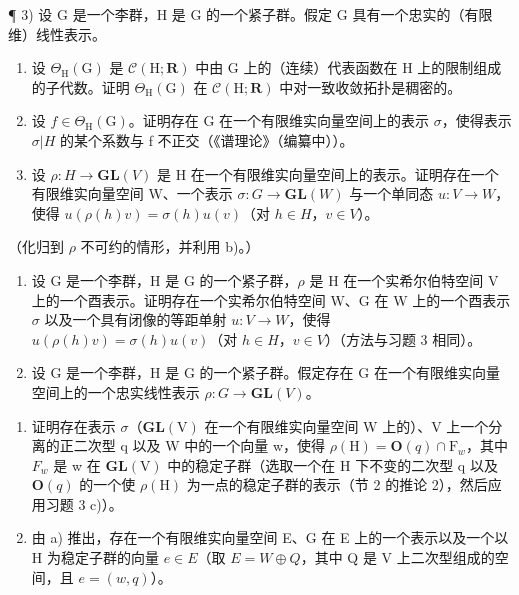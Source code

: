 \begin{enumerate}
¶ 3) 设 G 是一个李群，H 是 G 的一个紧子群。假定 G 具有一个忠实的（有限维）线性表示。

\begin{enumerate}
\def\labelenumi{\alph{enumi})}
\item
  设 \(\Theta_{\mathrm{H}}(\mathrm{G})\) 是 \(\mathcal{C}(\mathrm{H};\mathbf{R})\) 中由 G 上的（连续）代表函数在 H 上的限制组成的子代数。证明 \(\Theta_{\mathrm{H}}(\mathrm{G})\) 在 \(\mathcal{C}(\mathrm{H};\mathbf{R})\) 中对一致收敛拓扑是稠密的。
\item
  设 \(f \in \Theta_{\mathrm{H}}(\mathrm{G})\)。证明存在 G 在一个有限维实向量空间上的表示 \(\sigma\)，使得表示 \(\sigma|H\) 的某个系数与 f 不正交（《谱理论》（编纂中））。
\item
  设 \(\rho:H\to\mathbf{GL}(V)\) 是 H 在一个有限维实向量空间上的表示。证明存在一个有限维实向量空间 W、一个表示 \(\sigma:G\to\mathbf{GL}(W)\) 与一个单同态 \(u:V\to W\)，使得 \(u(\rho(h)v)=\sigma(h)u(v)\)（对 \(h\in H\)，\(v\in V\)）。
\end{enumerate}

（化归到 \(\rho\) 不可约的情形，并利用 b)。）

\begin{enumerate}
\def\labelenumi{\arabic{enumi})}
\setcounter{enumi}{3}
\item
  设 G 是一个李群，H 是 G 的一个紧子群，\(\rho\) 是 H 在一个实希尔伯特空间 V 上的一个酉表示。证明存在一个实希尔伯特空间 W、G 在 W 上的一个酉表示 \(\sigma\) 以及一个具有闭像的等距单射 \(u: V \to W\)，使得 \(u(\rho(h)v) = \sigma(h)u(v)\)（对 \(h \in H\)，\(v \in V\)）（方法与习题 3 相同）。
\item
  设 G 是一个李群，H 是 G 的一个紧子群。假定存在 G 在一个有限维实向量空间上的一个忠实线性表示 \(\rho: G \to \mathbf{GL}(V)\)。
\end{enumerate}

\begin{enumerate}
\def\labelenumi{\alph{enumi})}
\item
  证明存在表示 \(\sigma\)（\(\mathbf{GL}(\mathrm{V})\) 在一个有限维实向量空间 W 上的）、V 上一个分离的正二次型 q 以及 W 中的一个向量 w，使得 \(\rho(\mathrm{H}) = \mathbf{O}(q) \cap \mathrm{F}_{w}\)，其中 \(F_{w}\) 是 w 在 \(\mathbf{GL}(\mathrm{V})\) 中的稳定子群（选取一个在 H 下不变的二次型 q 以及 \(\mathbf{O}(q)\) 的一个使 \(\rho(\mathrm{H})\) 为一点的稳定子群的表示（节 2 的推论 2），然后应用习题 3 c)）。
\item
  由 a) 推出，存在一个有限维实向量空间 E、G 在 E 上的一个表示以及一个以 H 为稳定子群的向量 \(e \in E\)（取 \(E = W \oplus Q\)，其中 Q 是 V 上二次型组成的空间，且 \(e = (w, q)\)）。
\end{enumerate}


\end{enumerate}
